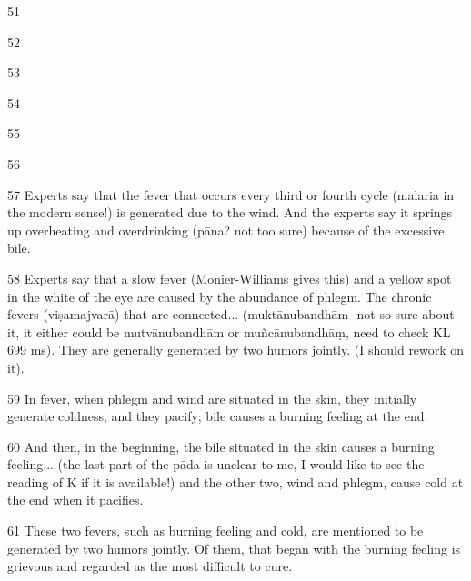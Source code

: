\begin{translation}
    
   \item[51]  
    
   \item[52]  
    
   \item[53]  
    
   \item[54]  
    
   \item[55]  
    
   \item[56]  
    
    \item[57]  Experts say that the fever that occurs every third or fourth cycle
    (malaria in the modern sense!) is generated due to the wind.  And the
    experts say it springs up overheating and overdrinking (pāna? not too
    sure) because of the excessive bile.
    
    \item[58]  Experts say that a slow fever (Monier-Williams gives this) and a
    yellow spot in the white of the eye are caused by the abundance of
    phlegm. The chronic fevers (viṣamajvarā) that are connected...
    (muktānubandhām- not so sure about it, it either could be mutvānubandhām
    or muñcānubandhāṃ, need to check KL 699 ms). They are generally
    generated by two humors jointly. (I should rework on it).
    
    \item[59]  In fever, when phlegm and wind are situated in the skin, they
    initially generate coldness, and they pacify; bile causes a burning
    feeling at the end.
    
    
    \item[60]  And then, in the beginning, the bile situated in the skin causes a
    burning feeling... (the last part of the pāda is unclear to me, I would
    like to see the reading of K if it is available!) and the other two,
    wind and phlegm, cause cold at the end when it pacifies.
    
    \item[61]  These two fevers, such as burning feeling and cold, are mentioned 
to
    be generated by two humors jointly. Of them, that began with the burning
    feeling is grievous and regarded as the most difficult to cure.
    
    

\end{translation}
